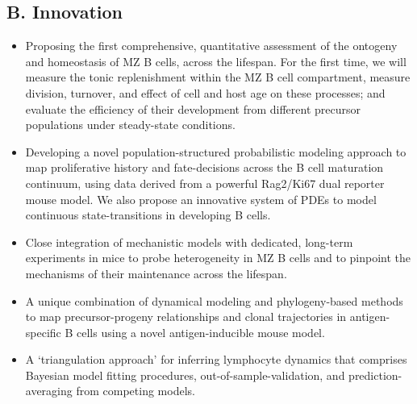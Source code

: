 \documentclass[11pt]{article}
\begin{document}
\subsection*{B. Innovation}
\vspace{-2mm}
\begin{itemize}
    \item Proposing the first comprehensive, quantitative assessment of the ontogeny and homeostasis of MZ B cells, across the lifespan.
    For the first time, we will measure the tonic replenishment within the MZ B cell compartment, measure division, turnover, and effect of cell and host age on these processes; and evaluate the efficiency of their development from different precursor populations under steady-state conditions.
    \item Developing a novel population-structured probabilistic modeling approach to map proliferative history and fate-decisions across the B cell maturation continuum, using data derived from a powerful Rag2/Ki67 dual reporter mouse model. %
   We also propose an innovative system of PDEs to model continuous state-transitions in developing B cells. %
   \item Close integration of  mechanistic models with dedicated, long-term experiments in mice to probe heterogeneity in MZ B cells and to pinpoint the mechanisms of their maintenance across the lifespan.   
    \item A unique combination of dynamical modeling and phylogeny-based methods to map precursor-progeny relationships and clonal trajectories in {antigen-specific B cells} using a novel antigen-inducible mouse model. %
    \item A `triangulation approach' for inferring lymphocyte dynamics that comprises Bayesian model fitting procedures, out-of-sample-validation, and  prediction-averaging from competing models. %

    \end{itemize}
    
\end{document}
